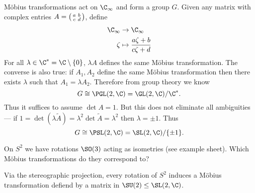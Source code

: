 \documentclass[a4paper]{article}
\begin{document}
Möbius transformations act on \(\C_\infty\) and form a group \(G\). Given any matrix with complex entries \(A = \begin{psmallmatrix} a & b \\ c & d \end{psmallmatrix}\), define
\begin{align*}
  \C_\infty &\to \C_\infty \\
  \zeta &\mapsto \frac{a\zeta + b}{c\zeta + d}
\end{align*}
For all \(\lambda \in \C^* = \C \setminus \{0\}\), \(\lambda A\) defines the same Möbius transformation. The converse is also true: if \(A_1, A_2\) define the same Möbius transformation then there exists \(\lambda\) such that \(A_1 = \lambda A_2\). Therefore from group theory we know
\[
  G \cong \PGL(2, \C) = \GL(2, \C)/\C^*.
\]
Thus it suffices to assume \(\det A = 1\). But this does not eliminate all ambiguities --- if \(1 = \det(\lambda \tilde A) = \lambda^2 \det \tilde A = \lambda^2\) then \(\lambda = \pm 1\). Thus
\[
  G \cong \PSL(2, \C) = \SL(2, \C)/\{\pm 1\}.
\]

On \(S^2\) we have rotations \(\SO(3)\) acting as isometries (see example sheet). Which Möbius transformations do they correspond to?

\begin{theorem}
  Via the stereographic projection, every rotation of \(S^2\) induces a Möbius transformation defiend by a matrix in \(\SU(2) \leq \SL(2, \C)\).
\end{theorem}
\end{document}
